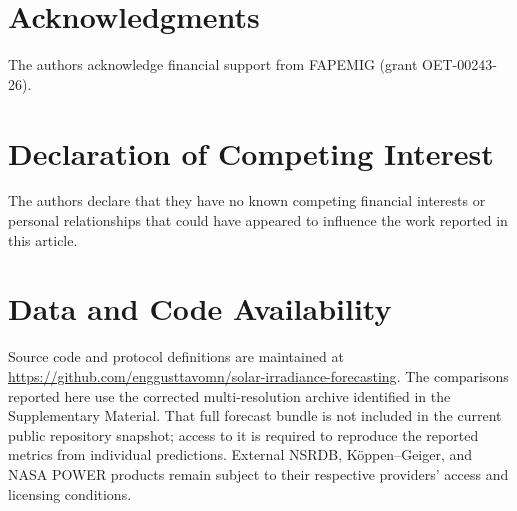 \documentclass[10pt,journal]{IEEEtran}
\begin{document}
\setlength{\dblfloatsep}{3pt plus 2pt minus 2pt}
\setlength{\dbltextfloatsep}{3pt plus 2pt minus 2pt}




\section*{Acknowledgments}
The authors acknowledge financial support from FAPEMIG (grant OET-00243-26).

\section*{Declaration of Competing Interest}
The authors declare that they have no known competing financial interests or
personal relationships that could have appeared to influence the work
reported in this article.

\section*{Data and Code Availability}
Source code and protocol definitions are maintained at
\url{https://github.com/enggusttavomn/solar-irradiance-forecasting}.
The comparisons reported here use the corrected multi-resolution archive
identified in the Supplementary Material. That full forecast bundle is not
included in the current public repository snapshot; access to it is required
to reproduce the reported metrics from individual predictions.
External NSRDB, K\"oppen--Geiger, and NASA POWER products remain subject to
their respective providers' access and licensing conditions.



\end{document}
